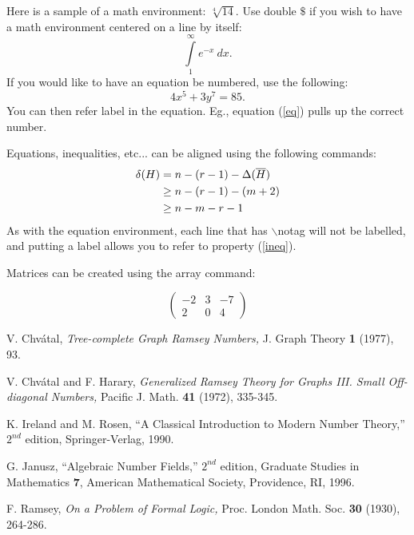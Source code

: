 \documentclass[10pt]{amsart}
\begin{document}
Here is a sample of a math environment: $\sqrt[4]{14}$.  Use double $\$$ if you wish to have a math environment centered on a line by itself:
$$\mathop{\int}\limits_{1}^{\infty} e^{-x} \ dx.$$
If you would like to have an equation be numbered, use the following:
\begin{equation}  4x^5+3y^7=85. \label{eq} \end{equation}
You can then refer label in the equation.  Eg., equation (\ref{eq}) pulls up the correct number.

Equations, inequalities, etc... can be aligned using the following commands:
\begin{align} \delta (H) &= n-(r-1)-\Delta (\overline{H}) \notag \\
                                    &\ge n-(r-1)-(m+2) \notag \\
                                    &\ge n-m-r-1 \label{ineq} \end{align}
As with the equation environment, each line that has $\backslash$notag will not be labelled, and putting a label allows you to refer to property (\ref{ineq}).

Matrices can be created using the array command:

$$\left( \begin{array}{rrr} -2 & 3 & -7 \\ 2 & 0 & 4 \end{array} \right)$$


\begin{thebibliography}{10}

 V. Chv\'atal, {\it Tree-complete Graph Ramsey Numbers,}  J. Graph Theory {\bf 1} (1977), 93.

 V. Chv\'atal and F. Harary, {\it Generalized Ramsey Theory for Graphs III. Small Off-diagonal Numbers,} Pacific J. Math. {\bf 41} (1972), 335-345.

 K. Ireland and M. Rosen, ``A Classical
Introduction to Modern Number Theory,'' $2^{nd}$ edition,
Springer-Verlag, 1990.

 G. Janusz, ``Algebraic Number Fields,'' $2^{nd}$ edition, Graduate Studies in Mathematics {\bf 7}, American Mathematical Society, Providence, RI, 1996.

 F. Ramsey, {\it On a Problem of Formal Logic,} Proc. London Math. Soc. {\bf 30} (1930), 264-286.



\end{thebibliography}
\end{document}
